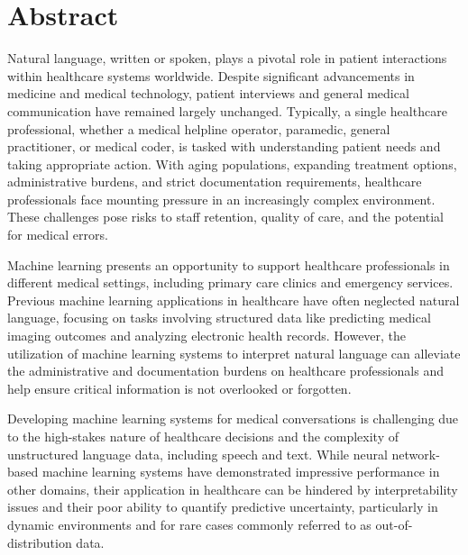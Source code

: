 
\chapter[abstract]{Abstract}

Natural language, written or spoken, plays a pivotal role in patient interactions within healthcare systems worldwide. Despite significant advancements in medicine and medical technology, patient interviews and general medical communication have remained largely unchanged. Typically, a single healthcare professional, whether a medical helpline operator, paramedic, general practitioner, or medical coder, is tasked with understanding patient needs and taking appropriate action. With aging populations, expanding treatment options, administrative burdens, and strict documentation requirements, healthcare professionals face mounting pressure in an increasingly complex environment. These challenges pose risks to staff retention, quality of care, and the potential for medical errors.

Machine learning presents an opportunity to support healthcare professionals in different medical settings, including primary care clinics and emergency services. Previous machine learning applications in healthcare have often neglected natural language, focusing on tasks involving structured data like predicting medical imaging outcomes and analyzing electronic health records. However, the utilization of machine learning systems to interpret natural language can alleviate the administrative and documentation burdens on healthcare professionals and help ensure critical information is not overlooked or forgotten.

Developing machine learning systems for medical conversations is challenging due to the high-stakes nature of healthcare decisions and the complexity of unstructured language data, including speech and text. While neural network-based machine learning systems have demonstrated impressive performance in other domains, their application in healthcare can be hindered by interpretability issues and their poor ability to quantify predictive uncertainty, particularly in dynamic environments and for rare cases commonly referred to as out-of-distribution data.


